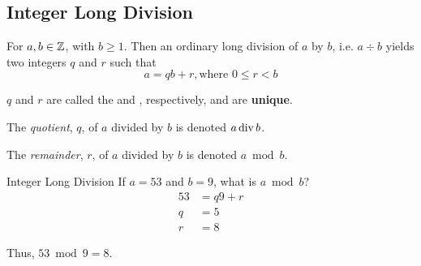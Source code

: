 \subsection{Integer Long Division}\label{subsec:Integer_Long_Division}
For $a, b \in \operatorname{\mathbb{Z}}$, with $b \geq 1$.
Then an ordinary long division of $a$ by $b$, i.e. $a \div b$ yields two integers $q$ and $r$ such that
\begin{equation}\label{eq:Integer_Long_Division}
  a = qb + r, \text{where } 0 \leq r < b
\end{equation}

$q$ and $r$ are called the  and , respectively, and are \textbf{unique}.

\begin{definition}[Quotient]\label{def:Integer_Quotient}
  The \emph{quotient}, $q$, of $a$ divided by $b$ is denoted $a \operatorname{\operatorname{div}} b$.
\end{definition}

\begin{definition}[Remainder]\label{def:Integer_Remainder}
  The \emph{remainder}, $r$, of $a$ divided by $b$ is denoted $a \bmod b$.
\end{definition}

\begin{example}{Integer Long Division}
  If $a=53$ and $b=9$, what is $a \bmod b$?
  \tcblower{}
  \begin{align*}
    53 &= q9 + r \\
    q &= 5 \\
    r &= 8
  \end{align*}

  Thus, $53 \bmod 9 = 8$.
\end{example}

